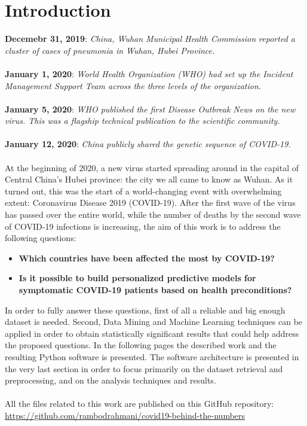 \documentclass[11pt,a4paper]{article}
\begin{document}
\section{Introduction}
\textbf{Decemebr 31, 2019}: \textit{China, Wuhan Municipal Health Commission
reported a cluster of cases of pneumonia in Wuhan, Hubei Province.}\\
\\
\textbf{January 1, 2020}: \textit{World Health Organization (WHO) had set up the
Incident Management Support Team across the three levels of the organization.}\\
\\
\textbf{January 5, 2020}: \textit{WHO published the first Disease Outbreak News
on the new virus. This was a flagship technical publication to the scientific
community.}\\
\\
\textbf{January 12, 2020}: \textit{China publicly shared the genetic sequence of
COVID-19.}\\
\\
At the beginning of 2020, a new virus started spreading around in the capital of
Central China's Hubei province: the city we all came to know as Wuhan. As it
turned out, this was the start of a world-changing event with overwhelming
extent: Coronavirus Disease 2019 (COVID-19). After the first wave of the virus
has passed over the entire world, while the number of deaths by the second wave
of COVID-19 infections is increasing, the aim of this work is to address the
following questions:
\begin{itemize}
	\item \textbf{Which countries have been affected the most by COVID-19?}
	\item \textbf{Is it possible to build personalized predictive models for
		symptomatic COVID-19 patients based on health preconditions?}
\end{itemize}
In order to fully answer these questions, first of all a reliable and big enough
dataset is needed. Second, Data Mining and Machine Learning techniques can be
applied in order to obtain statistically significant results that could help
address the proposed questions. In the following pages the described work and
the resulting Python software is presented. The software architecture is
presented in the very last section in order to focus primarily on the dataset
retrieval and preprocessing, and on the analysis techniques and results.\\
\\
All the files related to this work are published on this GitHub repository:
\url{https://github.com/rambodrahmani/covid19-behind-the-numbers}
\end{document}
